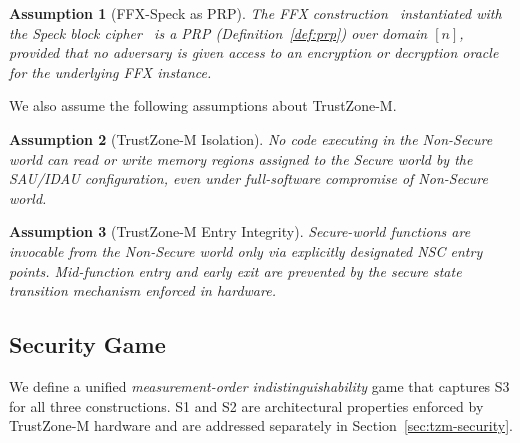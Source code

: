 \documentclass{ieeeaccess}
\newtheorem{assumption}{Assumption}[section]
\begin{document}
\begin{assumption}[FFX-Speck as PRP]
\label{asm:ffx-prp}
The FFX construction~\cite{bellare2010ffx} instantiated with the Speck block
cipher~\cite{speck} is a PRP (Definition~\ref{def:prp}) over
domain $[n]$, provided that no adversary is given access to an
encryption or decryption oracle for the underlying FFX instance.
\end{assumption}

We also assume the following assumptions about TrustZone-M.
 
\begin{assumption}[TrustZone-M Isolation]
\label{asm:tz-isolation}
No code executing in the Non-Secure world can read or write memory
regions assigned to the Secure world by the SAU/IDAU configuration,
even under full-software compromise of Non-Secure world.
\end{assumption}
 
\begin{assumption}[TrustZone-M Entry Integrity]
\label{asm:tz-entry}
Secure-world functions are invocable from the Non-Secure world only via
explicitly designated NSC entry points.
Mid-function entry and early exit are prevented by the secure state transition mechanism enforced in hardware.
\end{assumption}
 
 
\subsection{Security Game}
\label{sec:game}
 
We define a unified \emph{measurement-order indistinguishability} game that
captures S3 for all three constructions.
S1 and S2 are architectural properties enforced by TrustZone-M hardware
and are addressed separately in Section~\ref{sec:tzm-security}.
 
\end{document}
